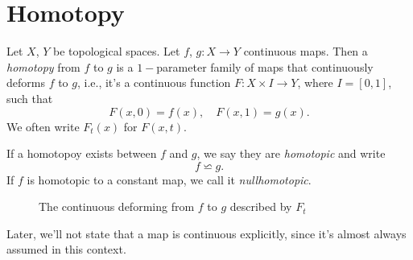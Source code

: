 \section{Homotopy}
\begin{definition}
	Let \(X\), \(Y\) be topological spaces. Let \(f\), \(g\colon X\to Y\) continuous maps. Then a \emph{homotopy} from \(f\)
	to \(g\) is a \(1-\)parameter family of maps that continuously deforms \(f\) to \(g\), i.e., it's a continuous function
	\(F\colon X\times I\to Y\), where \(I=\left[0,1\right]\), such that
	\[
		F(x, 0) = f(x),\quad F(x, 1) = g(x).
	\]
	We often write \(F_{t}(x)\) for \(F(x, t)\).

	If a homotopoy exists between \(f\) and \(g\), we say they are \emph{homotopic} and write
	\[
		f\backsimeq g.
	\]
	If \(f\) is homotopic to a constant map, we call it \emph{nullhomotopic}.
\end{definition}
\begin{figure}[H]
	\centering
	\caption{The continuous deforming from \(f\) to \(g\) described by \(F_t\)}
	\label{fig:def-homotopy}
\end{figure}

\begin{remark}
	Later, we'll not state that a map is continuous explicitly, since it's almost always assumed in this context.
\end{remark}

